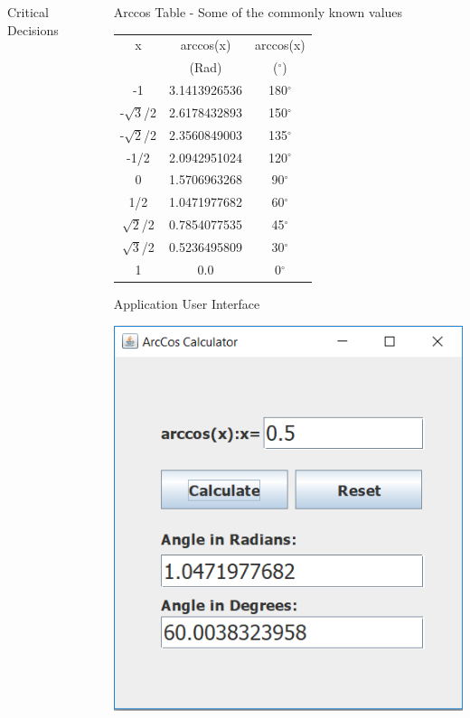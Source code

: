 \documentclass{beamer}
\begin{document}
\begin{frame}[fragile]
\begin{columns}[T]
\begin{column}{.27\textwidth}
\begin{block}{Critical Decisions}
\begin{itemize}
\end{itemize}
\end{block}

\end{column}

\begin{column}{.3\textwidth}

\begin{block}{Arccos Table - Some of the commonly known values}
\begin{center}
		\begin{tabular}{|c|c|c|}
			\hline
			x&arccos(x)&arccos(x)\\
			 &(Rad)&($^{\circ}$)\\
			 \hline
			 -1&3.1413926536&180$^{\circ}$\\
			 \hline
			 -$\sqrt{3}$/2&2.6178432893&150$^{\circ}$\\
			 \hline
			 -$\sqrt{2}$/2&2.3560849003&135$^{\circ}$\\
			 \hline
			 -1/2&2.0942951024&120$^{\circ}$\\
			 \hline
			 0&1.5706963268&90$^{\circ}$\\
			 \hline
			1/2&1.0471977682&60$^{\circ}$\\
			 \hline
			 $\sqrt{2}$/2&0.7854077535&45$^{\circ}$\\
			 \hline
			 $\sqrt{3}$/2&0.5236495809&30$^{\circ}$\\
			 \hline
			 1&0.0&0$^{\circ}$\\
			 \hline
		\end{tabular}
	\end{center}
\end{block}

\begin{block}{Application User Interface}
    \begin{center}
        \includegraphics[width=.60\columnwidth]{working.PNG}
    \end{center}
\end{block}
\end{column}


\end{columns}
\end{frame}
\end{document}
